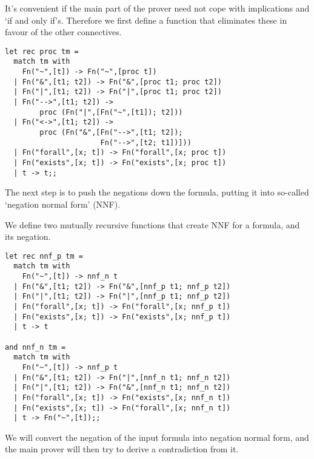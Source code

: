 \begin{slide*}


\vspace*{0.5cm}

It's convenient if the main part of the prover need not cope with implications
and `if and only if's. Therefore we first define a function that eliminates
these in favour of the other connectives.

\begin{black}\begin{footnotesize}\begin{verbatim}
let rec proc tm =
  match tm with
    Fn("~",[t]) -> Fn("~",[proc t])
  | Fn("&",[t1; t2]) -> Fn("&",[proc t1; proc t2])
  | Fn("|",[t1; t2]) -> Fn("|",[proc t1; proc t2])
  | Fn("-->",[t1; t2]) ->
        proc (Fn("|",[Fn("~",[t1]); t2]))
  | Fn("<->",[t1; t2]) ->
        proc (Fn("&",[Fn("-->",[t1; t2]);
                      Fn("-->",[t2; t1])]))
  | Fn("forall",[x; t]) -> Fn("forall",[x; proc t])
  | Fn("exists",[x; t]) -> Fn("exists",[x; proc t])
  | t -> t;;
\end{verbatim}\end{footnotesize}\end{black}

The next step is to push the negations down the formula, putting it into
so-called `negation normal form' (NNF).

\end{slide*}



\begin{slide*}


\vspace*{0.5cm}

We define two mutually recursive functions that create NNF for a formula, and
its negation.

\begin{black}\begin{footnotesize}\begin{verbatim}
let rec nnf_p tm =
  match tm with
    Fn("~",[t]) -> nnf_n t
  | Fn("&",[t1; t2]) -> Fn("&",[nnf_p t1; nnf_p t2])
  | Fn("|",[t1; t2]) -> Fn("|",[nnf_p t1; nnf_p t2])
  | Fn("forall",[x; t]) -> Fn("forall",[x; nnf_p t])
  | Fn("exists",[x; t]) -> Fn("exists",[x; nnf_p t])
  | t -> t

and nnf_n tm =
  match tm with
    Fn("~",[t]) -> nnf_p t
  | Fn("&",[t1; t2]) -> Fn("|",[nnf_n t1; nnf_n t2])
  | Fn("|",[t1; t2]) -> Fn("&",[nnf_n t1; nnf_n t2])
  | Fn("forall",[x; t]) -> Fn("exists",[x; nnf_n t])
  | Fn("exists",[x; t]) -> Fn("forall",[x; nnf_n t])
  | t -> Fn("~",[t]);;
\end{verbatim}\end{footnotesize}\end{black}

We will convert the negation of the input formula into negation normal form,
and the main prover will then try to derive a contradiction from it.

\end{slide*}




